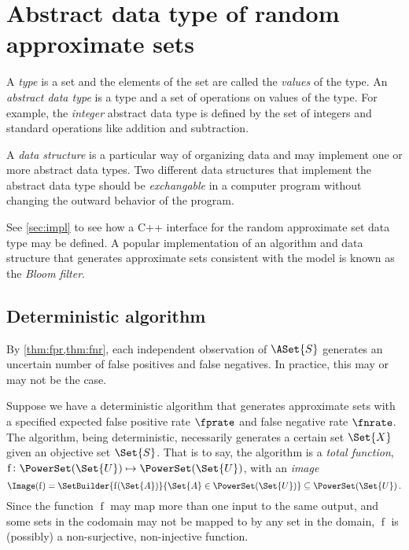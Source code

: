 \documentclass[ ../main.tex]{subfiles}
\begin{document}
\section{Abstract data type of random approximate sets}
\label{sec:adt}
A \emph{type} is a set and the elements of the set are called the \emph{values} 
of the type. An \emph{abstract data type} is a type and a set of operations on 
values of the type. For example, the \emph{integer} abstract data type is 
defined by the set of integers and standard operations like addition and 
subtraction.

A \emph{data structure} is a particular way of organizing data and may 
implement one or more abstract data types. Two different data structures that 
implement the abstract data type should be \emph{exchangable} in a computer 
program without changing the outward behavior of the program.

See \cref{sec:impl} to see how a C++ interface for the random approximate set 
data type may be defined. A popular implementation of an algorithm and data 
structure that generates approximate sets consistent with the model is known as 
the \emph{Bloom filter}.

\subsection{Deterministic algorithm}
By \cref{thm:fpr,thm:fnr}, each independent observation of $\ASet{S}$ generates 
an uncertain number of false positives and false negatives. In practice, this
may or may not be the case.

Suppose we have a deterministic algorithm that generates approximate sets with 
a specified expected false positive rate $\fprate$ and false negative rate 
$\fnrate$. The algorithm, being deterministic, necessarily generates a certain 
set $\Set{X}$ given an objective set $\Set{S}$. That is to say, the algorithm 
is a \emph{total function},
	$\operatorname{f} \colon \PowerSet(\Set{U}) \mapsto \PowerSet(\Set{U})$,
with an \emph{image}
\begin{equation}
\Image(\operatorname{f}) = 
    \SetBuilder{\operatorname{f}(\Set{A})}{\Set{A} \in \PowerSet(\Set{U})}
        \subseteq \PowerSet(\Set{U})\,.
\end{equation}
Since the function $\operatorname{f}$ may map more than one input to the same 
output, and some sets in the codomain may not be mapped to by any set in the 
domain, $\operatorname{f}$ is (possibly) a non-surjective, non-injective 
function.
\end{document}

